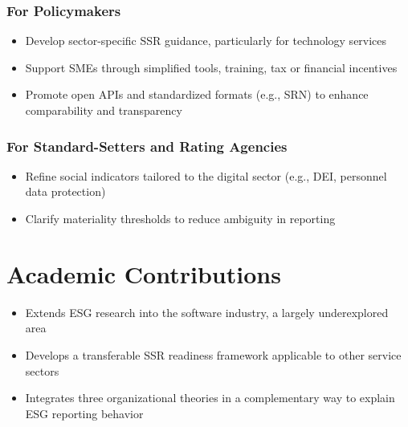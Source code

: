 \subsubsection{For Policymakers}
\begin{itemize}
    \item Develop sector-specific SSR guidance, particularly for technology services
    \item Support SMEs through simplified tools, training, tax or financial incentives
    \item Promote open APIs and standardized formats (e.g., SRN) to enhance comparability and transparency
\end{itemize}

\subsubsection{For Standard-Setters and Rating Agencies}
\begin{itemize}
    \item Refine social indicators tailored to the digital sector (e.g., DEI, personnel data protection)
    \item Clarify materiality thresholds to reduce ambiguity in reporting
\end{itemize}

\section{Academic Contributions}
\begin{itemize}
    \item Extends ESG research into the software industry, a largely underexplored area
    \item Develops a transferable SSR readiness framework applicable to other service sectors
    \item Integrates three organizational theories in a complementary way to explain ESG reporting behavior
\end{itemize}